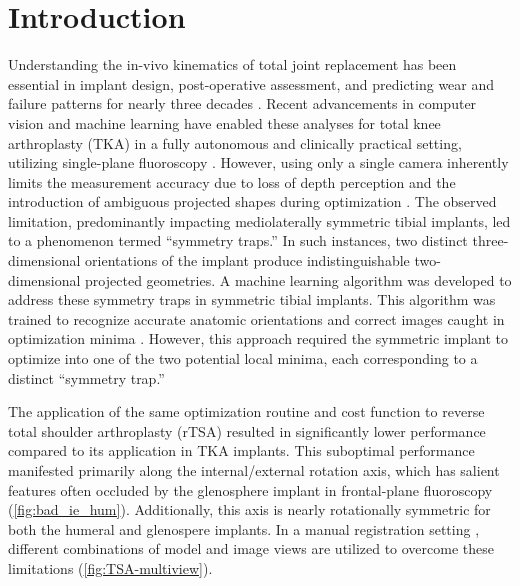 \section{Introduction}
Understanding the in-vivo kinematics of total joint replacement has been essential in implant design, post-operative assessment, and predicting wear and failure patterns for nearly three decades \cite{freglyComputationalWearPrediction2005,banks2003HapPaul2004,banksRationaleResultsFixedBearing2019}.
Recent advancements in computer vision and machine learning have enabled these analyses for total knee arthroplasty (TKA) in a fully autonomous and clinically practical setting, utilizing single-plane fluoroscopy \cite{brobergValidationMachineLearning2023,jensenJointTrackMachine2023}.
However, using only a single camera inherently limits the measurement accuracy due to loss of depth perception and the introduction of ambiguous projected shapes during optimization \cite{floodAutomatedRegistration3D2018,mahfouzRobustMethodRegistration2003,zuffiModelbasedMethodReconstruction1999,banksAccurateMeasurementThreedimensional1996}.
The observed limitation, predominantly impacting mediolaterally symmetric tibial implants, led to a phenomenon termed “symmetry traps.”
In such instances, two distinct three-dimensional orientations of the implant produce indistinguishable two-dimensional projected geometries.
A machine learning algorithm was developed to address these symmetry traps in symmetric tibial implants.
This algorithm was trained to recognize accurate anatomic orientations and correct images caught in optimization minima \cite{jensenCorrectingSymmetricImplantInReview}.
However, this approach required the symmetric implant to optimize into one of the two potential local minima, each corresponding to a distinct “symmetry trap.”

The application of the same optimization routine and cost function \cite{floodAutomatedRegistration3D2018,jensenJointTrackMachine2023} to reverse total shoulder arthroplasty (rTSA) resulted in significantly lower performance compared to its application in TKA implants.
This suboptimal performance manifested primarily along the internal/external rotation axis, which has salient features often occluded by the glenosphere implant in frontal-plane fluoroscopy (\cref{fig:bad_ie_hum}).
Additionally, this axis is nearly rotationally symmetric for both the humeral and glenospere implants.
In a manual registration setting \cite{muJointTrackOpenSourceEasily2007}, different combinations of model and image views are utilized to overcome these limitations (\cref{fig:TSA-multiview}).

